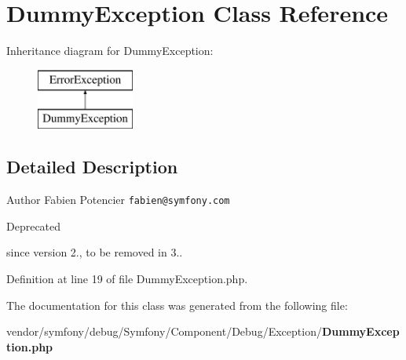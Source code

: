 \section{Dummy\+Exception Class Reference}
\label{class_symfony_1_1_component_1_1_debug_1_1_exception_1_1_dummy_exception}
Inheritance diagram for Dummy\+Exception\+:\begin{figure}[H]
\begin{center}
\leavevmode
\includegraphics[height=2.000000cm]{class_symfony_1_1_component_1_1_debug_1_1_exception_1_1_dummy_exception}
\end{center}
\end{figure}


\subsection{Detailed Description}
\begin{DoxyAuthor}{Author}
Fabien Potencier {\tt fabien@symfony.\+com}
\end{DoxyAuthor}
\begin{DoxyRefDesc}{Deprecated}
\item[{\bf Deprecated}]since version 2., to be removed in 3.. \end{DoxyRefDesc}


Definition at line 19 of file Dummy\+Exception.\+php.



The documentation for this class was generated from the following file\+:\begin{DoxyCompactItemize}
\item 
vendor/symfony/debug/\+Symfony/\+Component/\+Debug/\+Exception/{\bf Dummy\+Exception.\+php}\end{DoxyCompactItemize}
